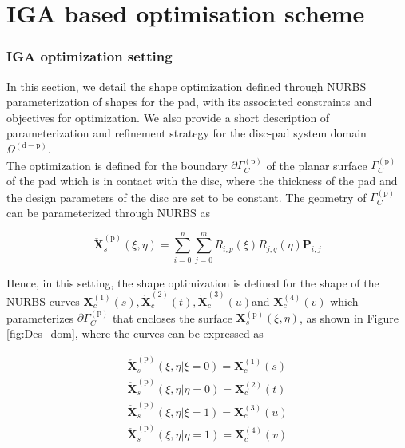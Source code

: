 \chapter{IGA based optimisation scheme}

\subsection{IGA optimization setting}

In this section, we detail the shape optimization defined through NURBS parameterization of shapes for the pad, with its associated constraints and objectives for optimization. We also provide a short description of parameterization and refinement strategy for the disc-pad system domain $\Omega^{(\mathrm{d-p})}$.\\

The optimization is defined for the boundary $\partial \Gamma_{C}^{(\mathrm p)}$ of the planar surface $\Gamma_{C}^{(\mathrm p)}$ of the pad which is in contact with the disc, where the thickness of the pad and the design parameters of the disc are set to be constant. The geometry of $\Gamma_{C}^{(\mathrm{p})}$ can be parameterized through NURBS as

\begin{equation}
    \bm {\check{X}}_{s}^{(\mathrm p)}(\xi,\eta) = \sum_{i=0}^n \sum_{j=0}^m R_{i,p}(\xi)R_{j,q}(\eta)\bm{P}_{i,j}
\end{equation}

  Hence, in this setting, the shape optimization is defined for the shape of the NURBS curves $\bm X_{c}^{(1)}(s),\bm {\check{X}}_{c}^{(2)}(t),\bm {\check{X}}_{c}^{(3)}(u)$and $\bm X_{c}^{(4)}(v)$ which parameterizes $\partial \Gamma_{C}^{(\mathrm p)}$ that encloses the surface $\bm X_s^{(\mathrm p)}(\xi,\eta)$, as shown in Figure \ref{fig:Des_dom}, where the curves can be expressed as
  
  \begin{equation}\label{curves_bound}
    \begin{array}{lr}
    \bm {\check{X}}_{s}^{(\mathrm p)}(\xi,\eta|\xi=0)=\bm X_c^{(1)}(s)\\
    \bm {\check{X}}_{s}^{(\mathrm p)}(\xi,\eta|\eta=0)=\bm X_c^{(2)}(t)\\
    \bm {\check{X}}_{s}^{(\mathrm p)}(\xi,\eta|\xi=1)=\bm X_c^{(3)}(u)\\
    \bm {\check{X}}_{s}^{(\mathrm p)}(\xi,\eta|\eta=1)=\bm X_c^{(4)}(v)
    \end{array}
\end{equation}

